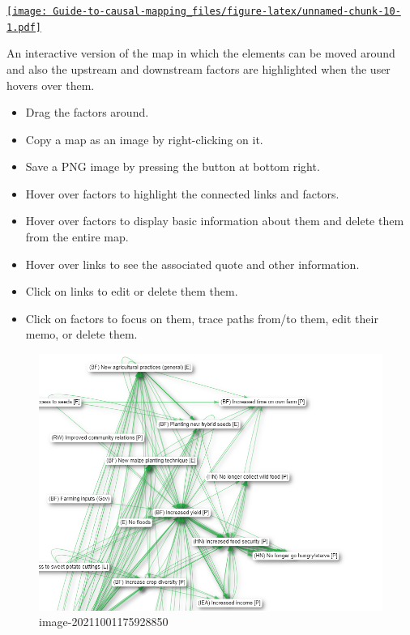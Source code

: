\documentclass[
]{book}
\providecommand{\tightlist}{%
  \setlength{\itemsep}{0pt}\setlength{\parskip}{0pt}}
\begin{document}
\href{https://player.vimeo.com/video/674383670}{\texttt{[image: Guide-to-causal-mapping\_files/figure-latex/unnamed-chunk-10-1.pdf]}}

An interactive version of the map in which the elements can be moved around and also the upstream and downstream factors are highlighted when the user hovers over them.

\begin{itemize}
\tightlist
\item
  Drag the factors around.
\item
  Copy a map as an image by right-clicking on it.
\item
  Save a PNG image by pressing the button at bottom right.
\item
  Hover over factors to highlight the connected links and factors.
\item
  Hover over factors to display basic information about them and delete them from the entire map.
\item
  Hover over links to see the associated quote and other information.
\item
  Click on links to edit or delete them them.
\item
  Click on factors to focus on them, trace paths from/to them, edit their memo, or delete them.
\end{itemize}

\begin{figure}
\centering
\includegraphics[width=6.77083in,height=\textheight]{_assets/focus.gif}
\caption{image-20211001175928850}
\end{figure}
\end{document}
